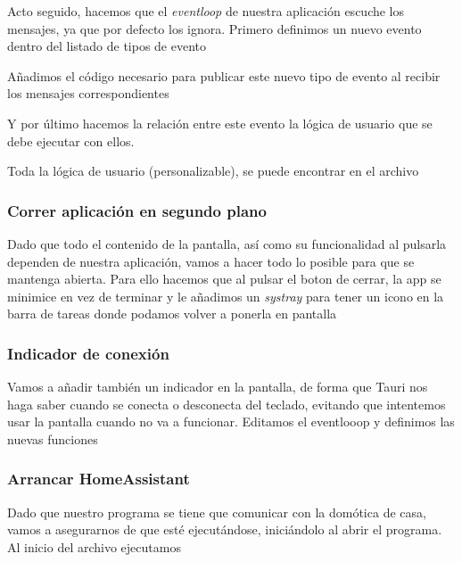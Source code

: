     \newpage
    Acto seguido, hacemos que el \textit{eventloop} de nuestra aplicación escuche los mensajes, ya que por defecto los ignora. Primero definimos un nuevo evento dentro del listado de tipos de evento

    Añadimos el código necesario para publicar este nuevo tipo de evento al recibir los mensajes correspondientes

    Y por último hacemos la relación entre este evento la lógica de usuario que se debe ejecutar con ellos.

    Toda la lógica de usuario (personalizable), se puede encontrar en el archivo \cite{user-rs}

    \newpage
    \subsubsection{Correr aplicación en segundo plano}
    Dado que todo el contenido de la pantalla, así como su funcionalidad al pulsarla dependen de nuestra aplicación, vamos a hacer todo lo posible para que se mantenga abierta. Para ello hacemos que al pulsar el boton de cerrar, la app se minimice en vez de terminar y le añadimos un \textit{systray} para tener un icono en la barra de tareas donde podamos volver a ponerla en pantalla

    \newpage
    \subsubsection{Indicador de conexión}
    Vamos a añadir también un indicador en la pantalla, de forma que Tauri nos haga saber cuando se conecta o desconecta del teclado, evitando que intentemos usar la pantalla cuando no va a funcionar. Editamos el eventlooop y definimos las nuevas funciones

    \subsubsection{Arrancar HomeAssistant}
    Dado que nuestro programa se tiene que comunicar con la domótica de casa, vamos a asegurarnos de que esté ejecutándose, iniciándolo al abrir el programa. Al inicio del archivo  ejecutamos 
